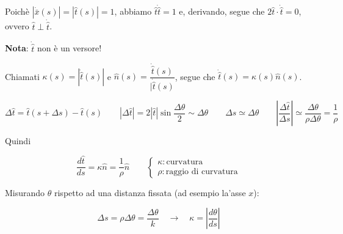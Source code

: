 Poichè $|\dot \bar x(s)| = |\hat t(s)| = 1$, abbiamo $\hat t \dot {\hat t} = 1$ e, derivando, segue che $2 \hat t \cdot \dot {\hat t} = 0$, ovvero $\hat t \perp \dot {\hat t}$.

\textbf{Nota}: $\dot {\hat t}$ non è un versore!

Chiamati $\kappa(s) = |\dot {\hat t}(s)|$ e $\hat n(s) = \dfrac {\dot {\hat t}(s)}{|\dot {\hat t}(s)}$, segue che $\dot {\hat t}(s) = \kappa(s) \hat n(s)$.

$$
\Delta \hat t = \hat t(s + \Delta s) - \hat t(s) 
\quad \quad
|\Delta \hat t| = 2 |\hat t| \sin \dfrac {\Delta \theta}2 \sim \Delta \theta
\quad \quad
\Delta s \simeq \Delta \theta
\quad \quad
\left| \dfrac {\Delta \hat t}{\Delta s} \right| \simeq \dfrac {\Delta \theta}{\rho \Delta \theta} = \dfrac 1\rho
$$

Quindi

$$
\dfrac {d\hat t}{ds} = \kappa\hat n = \dfrac 1\rho \hat n \quad \quad
\begin{cases}
    \kappa : \text{curvatura} \\
    \rho : \text{raggio di curvatura}
\end{cases}
$$

Misurando $\theta$ rispetto ad una distanza fissata (ad esempio la'asse $x$):

$$
\Delta s = \rho \Delta \theta = \dfrac {\Delta \theta}{k} \quad \to \quad \kappa = |\dfrac {d\theta}{ds}|
$$


